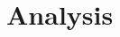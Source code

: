 \documentclass{article}
\theoremstyle{plain}
\theoremstyle{definition}
\theoremstyle{remark}
\newcommand{\roundto}[2]{%
        \FPsub\tempresult{#1}{1}%
        \FPmul\tempresult{\tempresult}{100}%
        \FPround\result{\tempresult}{1}%
        \result\%
    }
\newcommand{\moe}[1]{$\text{MoE}_{8\times#1\text{M}}$}
\newcommand{\dense}[1]{$\text{Dense}_{#1\text{M}}$}
\newcommand{\jmr}[2]{\textcolor{purple}{[JM:] \sout{#1} #2}}
\begin{document}
    
    
    
    
    
    
    
    
    
    
    \section{Analysis}
    
    \label{sec:analysis}
    
\end{document}
